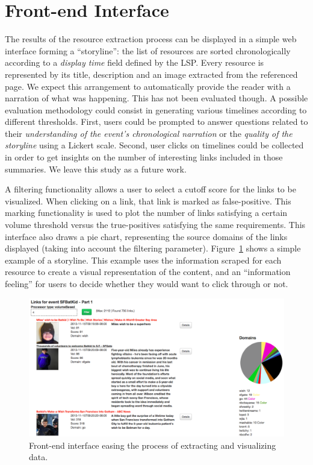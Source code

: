 \documentclass{sig-alternate-somus}
\begin{document}
\section{Front-end Interface}
\label{sec:front-end-interface}
The results of the resource extraction process can be displayed in a simple web interface forming a ``storyline'': the list of resources are sorted chronologically according to a \emph{display time} field defined by the LSP. Every resource is represented by its title, description and an image extracted from the referenced page. We expect this arrangement to automatically provide the reader with a narration of what was happening. This has not been evaluated though. A possible evaluation methodology could consist in generating various timelines according to different thresholds. First, users could be prompted to answer questions related to their \emph{understanding of the event's chronological narration} or the \emph{quality of the storyline} using a Lickert scale. Second, user clicks on timelines could be collected in order to get insights on the number of interesting links included in those summaries. We leave this study as a future work.

A filtering functionality allows a user to select a cutoff score for the links to be visualized. When clicking on a link, that link is marked as false-positive. This marking functionality is used to plot the number of links satisfying a certain volume threshold versus the true-positives satisfying the same requirements. This interface also draws a pie chart, representing the source domains of the links displayed (taking into account the filtering parameter). Figure~\ref{fig:javascript_interface} shows a simple example of a storyline. This example uses the information scraped for each resource to create a visual representation of the content, and an ``information feeling'' for users to decide whether they would want to click through or not.
\begin{figure}[htbp]
  \centering
  \includegraphics[width=\linewidth]{Figures/javascript_interface.png}
  \caption{Front-end interface easing the process of extracting and visualizing data.}
  \label{fig:javascript_interface}
\end{figure}
\end{document}
